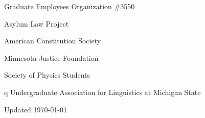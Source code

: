\documentclass[12pt,letterpaper]{report}
\newcommand{\listitemspace}{0.25em}
\renewenvironment{itemize}
{\begin{list}{}{\setlength{\leftmargin}{0em}
            \setlength{\parskip}{0em}
            \setlength{\itemsep}{\listitemspace}
            \setlength{\parsep}{\listitemspace}}}
{\end{list}}
\begin{document}
\begin{itemize}
    
	\item Graduate Employees Organization \#3550
    
	\item Asylum Law Project
    
	\item American Constitution Society
    
	\item Minnesota Justice Foundation
    
	\item Society of Physics Students
        
	\item q Undergraduate Association for Linguistics at Michigan State
        
\end{itemize}



\begin{center}
        \vfill
        Updated \monthyeardate\today
\end{center}
\end{document}
